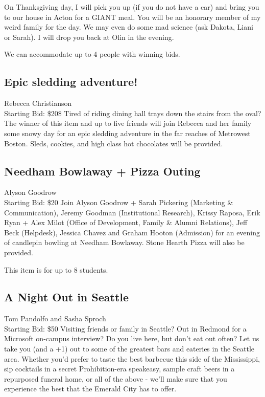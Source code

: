 \documentclass[11pt]{article}
\begin{document}
On Thanksgiving day, I will pick you up (if you do not have a car) and bring you to our house in Acton for a GIANT meal. You will be an honorary member of my weird family for the day. We may even do some mad science (ask Dakota, Liani or Sarah). I will drop you back at Olin in the evening.

We can accommodate up to 4 people with winning bids.
\subsection{Epic sledding adventure!}
Rebecca Christianson
\\
Starting Bid: \$20\$
\newline
Tired of riding dining hall trays down the stairs from the oval?  The winner of this item and up to five friends will join Rebecca and her family some snowy day for an epic sledding adventure in the far reaches of Metrowest Boston.  Sleds, cookies, and high class hot chocolates will be provided.
\subsection{Needham Bowlaway + Pizza Outing}
Alyson Goodrow
\\
Starting Bid: \$20
\newline
Join Alyson Goodrow + Sarah Pickering (Marketing \& Communication), Jeremy Goodman (Institutional Research), Krissy Raposa, Erik Ryan + Alex Milot (Office of Development, Family \& Alumni Relations), Jeff Beck (Helpdesk), Jessica Chavez and Graham Hooton (Admission) for an evening of candlepin bowling at Needham Bowlaway. Stone Hearth Pizza will also be provided.

This item is for up to 8 students.
\subsection{A Night Out in Seattle}
Tom Pandolfo and Sasha Sproch
\\
Starting Bid: \$50
\newline
Visiting friends or family in Seattle? Out in Redmond for a Microsoft on-campus interview? Do you live here, but don't eat out often? Let us take you (and a +1) out to some of the greatest bars and eateries in the Seattle area. Whether you'd prefer to taste the best barbecue this side of the Mississippi, sip cocktails in a secret Prohibition-era speakeasy, sample craft beers in a repurposed funeral home, or all of the above - we'll make sure that you experience the best that the Emerald City has to offer.
\end{document}
